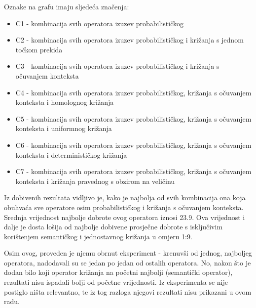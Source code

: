 Oznake na grafu imaju sljedeća značenja:

\begin{itemize}
\item{C1 - kombinacija svih operatora izuzev probabilističkog}
\item{C2 - kombinacija svih operatora izuzev probabilističkog i križanja s jednom točkom prekida}
\item{C3 - kombinacija svih operatora izuzev probabilističkog i križanja s očuvanjem konteksta}
\item{C4 - kombinacija svih operatora izuzev probabilističkog, križanja s očuvanjem konteksta i homolognog križanja}
\item{C5 - kombinacija svih operatora izuzev probabilističkog, križanja s očuvanjem konteksta i uniformnog križanja}
\item{C6 - kombinacija svih operatora izuzev probabilističkog, križanja s očuvanjem konteksta i determinističkog križanja}
\item{C7 - kombinacija svih operatora izuzev probabilističkog, križanja s očuvanjem konteksta i križanja pravednog s obzirom na veličinu}

\end{itemize}


Iz dobivenih rezultata vidljivo je, kako je najbolja od svih kombinacija ona koja obuhvaća sve operatore osim probabilističkog i križanja s očuvanjem konteksta. Srednja vrijednost najbolje dobrote ovog operatora iznosi 23.9. Ova vrijednost i dalje je dosta lošija od najbolje dobivene prosječne dobrote s isključivim korištenjem semantičkog i jednostavnog križanja u omjeru 1:9.

Osim ovog, proveden je njemu obrnut eksperiment - krenuvši od jednog, najboljeg operatora, nadodavali su se jedan po jedan od ostalih operatora. No, nakon što je dodan bilo koji operator križanja na početni najbolji (semantički operator), rezultati nisu ispadali bolji od početne vrijednosti. Iz eksperimenta se nije postiglo ništa relevantno, te iz tog razloga njegovi rezultati nisu prikazani u ovom radu.

